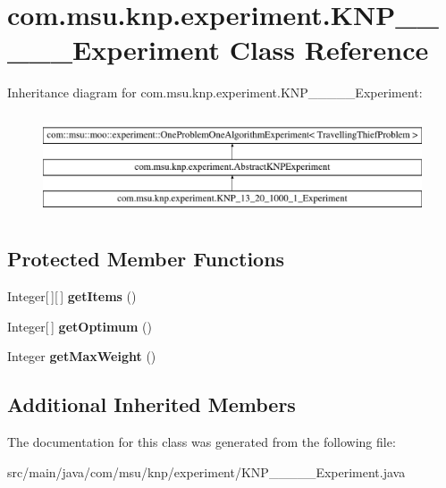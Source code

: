 \hypertarget{classcom_1_1msu_1_1knp_1_1experiment_1_1KNP__13__20__1000__1__Experiment}{\section{com.\-msu.\-knp.\-experiment.\-K\-N\-P\-\_\-\_\-\_\-\_\-\_\-\-Experiment Class Reference}
\label{classcom_1_1msu_1_1knp_1_1experiment_1_1KNP__13__20__1000__1__Experiment}
}
Inheritance diagram for com.\-msu.\-knp.\-experiment.\-K\-N\-P\-\_\-\_\-\_\-\_\-\_\-\-Experiment\-:\begin{figure}[H]
\begin{center}
\leavevmode
\includegraphics[height=3.000000cm]{classcom_1_1msu_1_1knp_1_1experiment_1_1KNP__13__20__1000__1__Experiment}
\end{center}
\end{figure}
\subsection*{Protected Member Functions}
\begin{DoxyCompactItemize}
\item 
\hypertarget{classcom_1_1msu_1_1knp_1_1experiment_1_1KNP__13__20__1000__1__Experiment_a121904d1b29cfbbff737549879a5b928}{Integer\mbox{[}$\,$\mbox{]}\mbox{[}$\,$\mbox{]} {\bfseries get\-Items} ()}\label{classcom_1_1msu_1_1knp_1_1experiment_1_1KNP__13__20__1000__1__Experiment_a121904d1b29cfbbff737549879a5b928}

\item 
\hypertarget{classcom_1_1msu_1_1knp_1_1experiment_1_1KNP__13__20__1000__1__Experiment_a14fef58c578e8e3c15cee5e02080ac4a}{Integer\mbox{[}$\,$\mbox{]} {\bfseries get\-Optimum} ()}\label{classcom_1_1msu_1_1knp_1_1experiment_1_1KNP__13__20__1000__1__Experiment_a14fef58c578e8e3c15cee5e02080ac4a}

\item 
\hypertarget{classcom_1_1msu_1_1knp_1_1experiment_1_1KNP__13__20__1000__1__Experiment_af5f0209c9c18c7586d4a24a668c38839}{Integer {\bfseries get\-Max\-Weight} ()}\label{classcom_1_1msu_1_1knp_1_1experiment_1_1KNP__13__20__1000__1__Experiment_af5f0209c9c18c7586d4a24a668c38839}

\end{DoxyCompactItemize}
\subsection*{Additional Inherited Members}


The documentation for this class was generated from the following file\-:\begin{DoxyCompactItemize}
\item 
src/main/java/com/msu/knp/experiment/K\-N\-P\-\_\-\_\-\_\-\_\-\_\-\-Experiment.\-java\end{DoxyCompactItemize}
